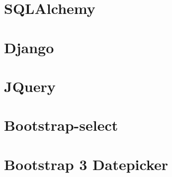 \section{SQLAlchemy}

\section{Django}

\section{JQuery}

\section{Bootstrap-select}

\section{Bootstrap 3 Datepicker}